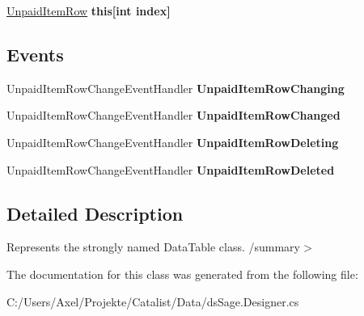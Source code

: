 \begin{DoxyCompactItemize}
\item 
\hyperlink{class_products_1_1_data_1_1ds_sage_1_1_unpaid_item_row}{Unpaid\+Item\+Row} {\bfseries this\mbox{[}int index\mbox{]}}\hypertarget{class_products_1_1_data_1_1ds_sage_1_1_unpaid_item_data_table_a4b25412dc5c20b1b07507835c3b91e68}{}\label{class_products_1_1_data_1_1ds_sage_1_1_unpaid_item_data_table_a4b25412dc5c20b1b07507835c3b91e68}

\end{DoxyCompactItemize}
\subsection*{Events}
\begin{DoxyCompactItemize}
\item 
Unpaid\+Item\+Row\+Change\+Event\+Handler {\bfseries Unpaid\+Item\+Row\+Changing}\hypertarget{class_products_1_1_data_1_1ds_sage_1_1_unpaid_item_data_table_aa6fc81d3d02ac57f5a6e7c78d6145c1c}{}\label{class_products_1_1_data_1_1ds_sage_1_1_unpaid_item_data_table_aa6fc81d3d02ac57f5a6e7c78d6145c1c}

\item 
Unpaid\+Item\+Row\+Change\+Event\+Handler {\bfseries Unpaid\+Item\+Row\+Changed}\hypertarget{class_products_1_1_data_1_1ds_sage_1_1_unpaid_item_data_table_a07f1dd8efbdebc4aea1f3117996866f3}{}\label{class_products_1_1_data_1_1ds_sage_1_1_unpaid_item_data_table_a07f1dd8efbdebc4aea1f3117996866f3}

\item 
Unpaid\+Item\+Row\+Change\+Event\+Handler {\bfseries Unpaid\+Item\+Row\+Deleting}\hypertarget{class_products_1_1_data_1_1ds_sage_1_1_unpaid_item_data_table_ae3558b28ecaed7b42de362ade1a3e422}{}\label{class_products_1_1_data_1_1ds_sage_1_1_unpaid_item_data_table_ae3558b28ecaed7b42de362ade1a3e422}

\item 
Unpaid\+Item\+Row\+Change\+Event\+Handler {\bfseries Unpaid\+Item\+Row\+Deleted}\hypertarget{class_products_1_1_data_1_1ds_sage_1_1_unpaid_item_data_table_ac034f69163d01e08399085d3f808ebd3}{}\label{class_products_1_1_data_1_1ds_sage_1_1_unpaid_item_data_table_ac034f69163d01e08399085d3f808ebd3}

\end{DoxyCompactItemize}


\subsection{Detailed Description}
Represents the strongly named Data\+Table class. /summary$>$ 

The documentation for this class was generated from the following file\+:\begin{DoxyCompactItemize}
\item 
C\+:/\+Users/\+Axel/\+Projekte/\+Catalist/\+Data/ds\+Sage.\+Designer.\+cs\end{DoxyCompactItemize}
